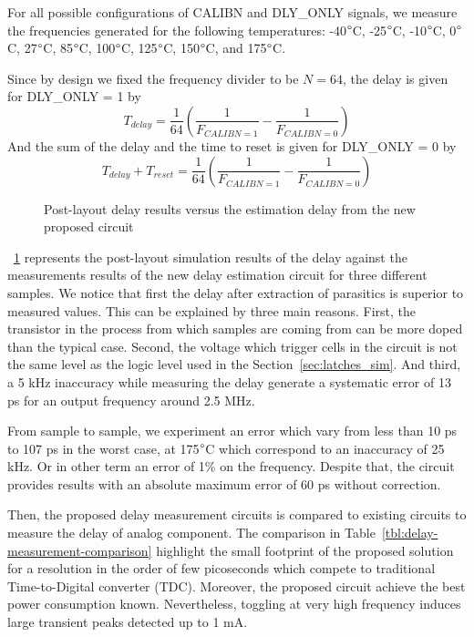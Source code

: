 For all possible configurations of CALIBN and DLY\_ONLY signals, we measure the frequencies generated for the following temperatures: -40$\degree$C, -25$\degree$C, -10$\degree$C, 0$\degree$C, 27$\degree$C, 85$\degree$C, 100$\degree$C, 125$\degree$C, 150$\degree$C, and 175$\degree$C.

Since by design we fixed the frequency divider to be $N = 64$, the delay is given for DLY\_ONLY = 1 by
\begin{equation}
 T_{delay} = \frac{1}{64} \left(\frac{1}{F_{CALIBN=1}}-\frac{1}{F_{CALIBN=0}} \right)
\end{equation}
And the sum of the delay and the time to reset is given for DLY\_ONLY = 0 by
\begin{equation}
    T_{delay}+T_{reset} = \frac{1}{64} \left(\frac{1}{F_{CALIBN=1}}-\frac{1}{F_{CALIBN=0}} \right)
\end{equation}

\begin{figure}[htp]
    \centering
    
    \caption{Post-layout delay results versus the estimation delay from the new proposed circuit}
    \label{fig:delay_vs_meas}
\end{figure}

\figurename~\ref{fig:delay_vs_meas} represents the post-layout simulation results of the delay against the measurements results of the new delay estimation circuit for three different samples. We notice that first the delay after extraction of parasitics is superior to measured values. This can be explained by three main reasons. First, the transistor in the process from which samples are coming from can be more doped than the typical case. Second, the voltage which trigger cells in the circuit is not the same level as the logic level used in the Section~\ref{sec:latches_sim}. And third, a 5 kHz inaccuracy while measuring the delay generate a systematic error of 13 ps for an output frequency around 2.5 MHz.

From sample to sample, we experiment an error which vary from less than 10 ps to 107 ps in the worst case, at 175\(\degree\)C which correspond to an inaccuracy of 25 kHz. Or in other term an error of 1\% on the frequency. Despite that, the circuit provides results with an absolute maximum error of 60 ps without correction.

Then, the proposed delay measurement circuits is compared to existing circuits to measure the delay of analog component. The comparison in Table~\ref{tbl:delay-measurement-comparison} highlight the small footprint of the proposed solution for a resolution in the order of few picoseconds which compete to traditional Time-to-Digital converter (TDC). Moreover, the proposed circuit achieve the best power consumption known. Nevertheless, toggling at very high frequency induces large transient peaks detected up to 1 mA. 

